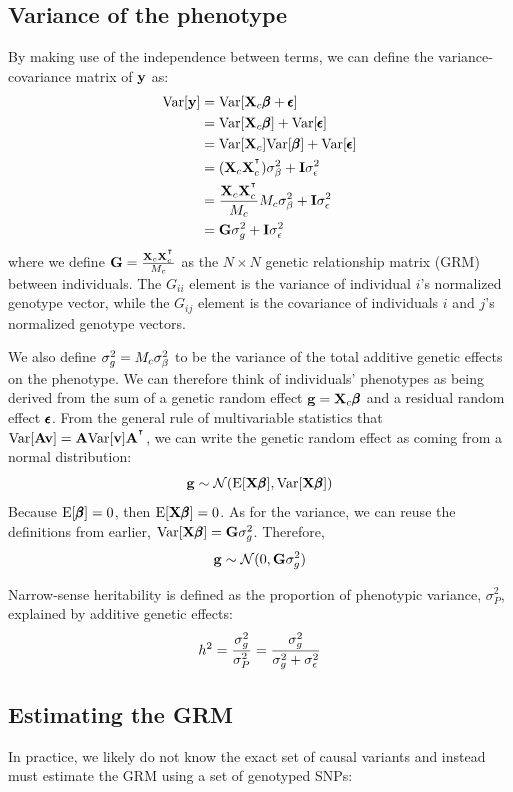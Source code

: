 \documentclass[12pt]{article}
\begin{document}
\subsection{Variance of the phenotype}
By making use of the independence between terms, we can define the variance-covariance matrix of $\mathbf{y}$ as:
\begin{align*}
    \mathrm{Var}[\mathbf{y}] &= \mathrm{Var}[\mathbf{X}_c \pmb{\beta} + \pmb{\epsilon}] \\
    &= \mathrm{Var}[\mathbf{X}_c \pmb{\beta}] + \mathrm{Var}[\pmb{\epsilon}] \\
    &= \mathrm{Var}[\mathbf{X}_c] \mathrm{Var}[\pmb{\beta}] + \mathrm{Var}[\pmb{\epsilon}] \\
    &= (\mathbf{X}_c \mathbf{X}_c^{^\intercal}) \sigma_{\beta}^2 + \mathbf{I} \sigma_{\epsilon}^2 \\
    &= \frac{\mathbf{X}_c \mathbf{X}_c^{^\intercal}}{M_c} M_c \sigma_{\beta}^2 + \mathbf{I} \sigma_{\epsilon}^2 \\
    &= \mathbf{G} \sigma_g^2 + \mathbf{I} \sigma_{\epsilon}^2 \\
\end{align*}
where we define $\mathbf{G} = \frac{\mathbf{X}_c \mathbf{X}_c^{^\intercal}}{M_c}$ as the $N \times N$ genetic relationship matrix (GRM) between individuals.
The $G_{ii}$ element is the variance of individual $i$'s normalized genotype vector, while the $G_{ij}$ element is the covariance of individuals $i$ and $j$'s normalized genotype vectors.

We also define $\sigma_g^2 = M_c \sigma_{\beta}^2$ to be the variance of the total additive genetic effects on the phenotype. We can therefore think of individuals' phenotypes as being derived from the sum of a genetic random effect $\mathbf{g} = \mathbf{X}_c \pmb{\beta}$ and a residual random effect $\pmb{\epsilon}$. From the general rule of multivariable statistics that $\mathrm{Var}[\mathbf{A} \mathbf{v}] = \mathbf{A} \mathrm{Var}[\mathbf{v}] \mathbf{A}^{^\intercal}$, we can write the genetic random effect as coming from a normal distribution:
$$ \mathbf{g} \sim \mathcal{N}(\mathrm{E}[\mathbf{X} \pmb{\beta}], \mathrm{Var}[\mathbf{X} \pmb{\beta}]) $$
Because $\mathrm{E}[\pmb{\beta}] = 0$, then $\mathrm{E}[\mathbf{X} \pmb{\beta}] = 0$. As for the variance, we can reuse the definitions from earlier, $\mathrm{Var}[\mathbf{X} \pmb{\beta}] =  \mathbf{G} \sigma_g^2$. Therefore,
$$ \mathbf{g} \sim \mathcal{N}(0, \mathbf{G} \sigma_g^2) $$

Narrow-sense heritability is defined as the proportion of phenotypic variance, $\sigma_P^2$, explained by additive genetic effects:
$$ h^2 = \frac{\sigma_g^2}{\sigma_P^2} = \frac{\sigma_g^2}{\sigma_g^2 + \sigma_{\epsilon}^2} $$

\subsection{Estimating the GRM}

In practice, we likely do not know the exact set of causal variants and instead must estimate the GRM using a set of genotyped SNPs:
\end{document}
